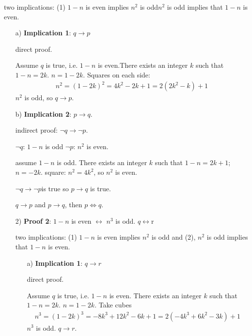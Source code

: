 \documentclass[11pt]{article}
\begin{document}
{\begin{itemize}
	two implications: (1) $1-n$ is even implies $n^2$ is odd\newline $n^2$ is odd implies that $1-n$ is even.
	
	\begin{itemize}
	\item [a)] \textbf{Implication 1}: $q \rightarrow p$
	
	direct proof.
	
	Assume $q$ is true, i.e. $1-n$ is even.\newline There exists an integer $k$ such that $1-n = 2k$. 
	$n = 1 - 2k$. Squares on each side:
	\begin{eqnarray*}
	n^2 = (1-2k)^2 = 4 k^2 - 2k +1 = 2(2k^2 -k) + 1
	\end{eqnarray*}
	 $n^2$ is odd, so $q \rightarrow p$.
	
	\item [b)] \textbf{Implication 2}: $p \rightarrow q$.
	
	indirect proof: $\neg q \rightarrow \neg p$.\newline
	
	 $\neg q$: $1-n$ is odd\newline
	 $\neg p$: $n^2$ is even.\newline
	
	assume $1-n$ is odd. There exists an integer $k$ such that $1-n=2k+1$; $n=-2k$.
	square: $n^2=4k^2$, so $n^2$ is even.
	
	 $\neg q \rightarrow \neg p$is true so $p \rightarrow q$ is true.
	
	
	$q \rightarrow p$ and $p \rightarrow q$, then $p \Leftrightarrow q$. \newpage
	
	\item [2)] \textbf{Proof 2}: $1-n$ is even $\leftrightarrow$ $n^3$ is odd. $q\leftrightarrow $r
	
	two implications: (1) $1-n$ is even implies $n^2$ is odd and (2), $n^2$ is odd implies that $1-n$ is even.
	
	\begin{itemize}
	\item [a)] \textbf{Implication 1}: $q \rightarrow r$
	
	direct proof.
	
	Assume $q$ is true, i.e. $1-n$ is even. There exists an integer $k$ such that $1-n = 2k$.
	$n = 1 - 2k$. Take cubes
	\begin{eqnarray*}
	n^3 = (1-2k)^3 = -8k^3 +12k^2 -6k + 1 = 2(-4k^3+6k^2 -3k) +1
	\end{eqnarray*}
	$n^3$ is odd.  $q \rightarrow r$.
	

\end{itemize}
\end{itemize}
\end{itemize}}
\end{document}
